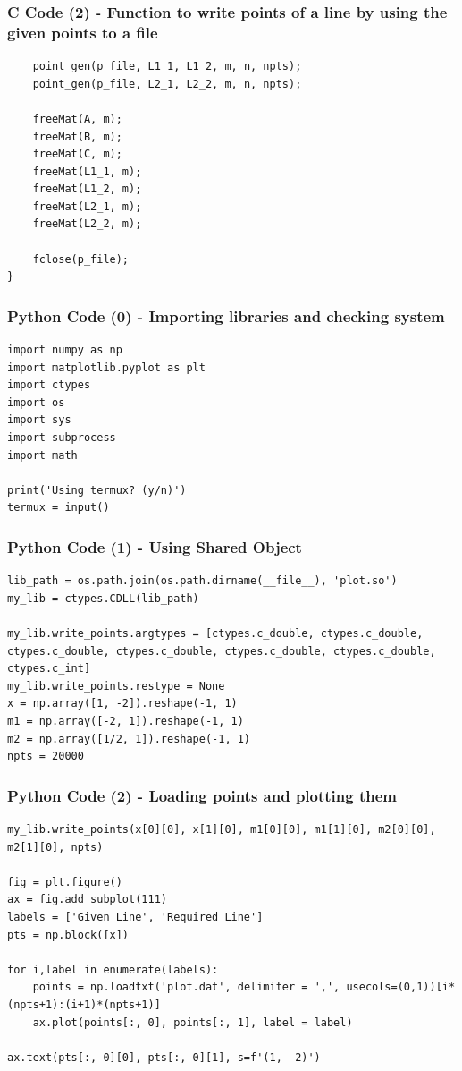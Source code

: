 \documentclass{beamer}
\begin{document}
\begin{frame}[fragile]
    \frametitle{C Code (2) - Function to write points of a line by using the given points to a file}
    \begin{lstlisting}
    point_gen(p_file, L1_1, L1_2, m, n, npts);
    point_gen(p_file, L2_1, L2_2, m, n, npts);

    freeMat(A, m);
    freeMat(B, m);
    freeMat(C, m);
    freeMat(L1_1, m);
    freeMat(L1_2, m);
    freeMat(L2_1, m);
    freeMat(L2_2, m);

    fclose(p_file);
}
    \end{lstlisting}
\end{frame}

\begin{frame}[fragile]
    \frametitle{Python Code (0) - Importing libraries and checking system}
    \begin{lstlisting}
import numpy as np
import matplotlib.pyplot as plt
import ctypes
import os
import sys
import subprocess
import math

print('Using termux? (y/n)')
termux = input()
\end{lstlisting}
\end{frame}

\begin{frame}[fragile]
    \frametitle{Python Code (1) - Using Shared Object}
    \begin{lstlisting}
lib_path = os.path.join(os.path.dirname(__file__), 'plot.so')
my_lib = ctypes.CDLL(lib_path)

my_lib.write_points.argtypes = [ctypes.c_double, ctypes.c_double, ctypes.c_double, ctypes.c_double, ctypes.c_double, ctypes.c_double, ctypes.c_int]
my_lib.write_points.restype = None
x = np.array([1, -2]).reshape(-1, 1)
m1 = np.array([-2, 1]).reshape(-1, 1)
m2 = np.array([1/2, 1]).reshape(-1, 1)
npts = 20000
\end{lstlisting}
\end{frame}

\begin{frame}[fragile]
    \frametitle{Python Code (2) - Loading points and plotting them}
    \begin{lstlisting}
my_lib.write_points(x[0][0], x[1][0], m1[0][0], m1[1][0], m2[0][0], m2[1][0], npts)

fig = plt.figure()
ax = fig.add_subplot(111)
labels = ['Given Line', 'Required Line']
pts = np.block([x])

for i,label in enumerate(labels):
    points = np.loadtxt('plot.dat', delimiter = ',', usecols=(0,1))[i*(npts+1):(i+1)*(npts+1)]
    ax.plot(points[:, 0], points[:, 1], label = label)

ax.text(pts[:, 0][0], pts[:, 0][1], s=f'(1, -2)')
\end{lstlisting}
\end{frame}
\end{document}
